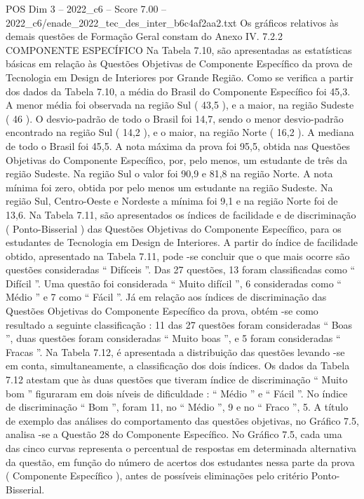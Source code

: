 \begin{textsample}{POS Dim 3 – 2022\_c6 – Score 7.00 – 2022\_c6/enade\_2022\_tec\_des\_inter\_b6c4af2aa2.txt}
Os gráficos relativos às demais questões de Formação Geral constam do Anexo IV. 7.2.2 COMPONENTE ESPECÍFICO Na Tabela 7.10, são apresentadas as estatísticas básicas em relação às Questões Objetivas de Componente Específico da prova de Tecnologia em Design de Interiores por Grande Região.
Como se verifica a partir dos dados da Tabela 7.10, a média do Brasil do Componente Específico foi 45,3.
A menor média foi observada na região Sul ( 43,5 ), e a maior, na região Sudeste ( 46 ).
O desvio-padrão de todo o Brasil foi 14,7, sendo o menor desvio-padrão encontrado na região Sul ( 14,2 ), e o maior, na região Norte ( 16,2 ).
A mediana de todo o Brasil foi 45,5.
A nota máxima da prova foi 95,5, obtida nas Questões Objetivas do Componente Específico, por, pelo menos, um estudante de três da região Sudeste.
Na região Sul o valor foi 90,9 e 81,8 na região Norte.
A nota mínima foi zero, obtida por pelo menos um estudante na região Sudeste.
Na região Sul, Centro-Oeste e Nordeste a mínima foi 9,1 e na região Norte foi de 13,6.
Na Tabela 7.11, são apresentados os índices de facilidade e de discriminação ( Ponto-Bisserial ) das Questões Objetivas do Componente Específico, para os estudantes de Tecnologia em Design de Interiores.
A partir do índice de facilidade obtido, apresentado na Tabela 7.11, pode -se concluir que o que mais ocorre são questões consideradas “ Difíceis ”.
Das 27 questões, 13 foram classificadas como “ Difícil ”.
Uma questão foi considerada “ Muito difícil ”, 6 consideradas como “ Médio ” e 7 como “ Fácil ”.
Já em relação aos índices de discriminação das Questões Objetivas do Componente Específico da prova, obtém -se como resultado a seguinte classificação : 11 das 27 questões foram consideradas “ Boas ”, duas questões foram consideradas “ Muito boas ”, e 5 foram consideradas “ Fracas ”.
Na Tabela 7.12, é apresentada a distribuição das questões levando -se em conta, simultaneamente, a classificação dos dois índices.
Os dados da Tabela 7.12 atestam que às duas questões que tiveram índice de discriminação “ Muito bom ” figuraram em dois níveis de dificuldade : “ Médio ” e “ Fácil ”.
No índice de discriminação “ Bom ”, foram 11, no “ Médio ”, 9 e no “ Fraco ”, 5.
A título de exemplo das análises do comportamento das questões objetivas, no Gráfico 7.5, analisa -se a Questão 28 do Componente Específico.
No Gráfico 7.5, cada uma das cinco curvas representa o percentual de respostas em determinada alternativa da questão, em função do número de acertos dos estudantes nessa parte da prova ( Componente Específico ), antes de possíveis eliminações pelo critério Ponto-Bisserial.

\end{textsample}
